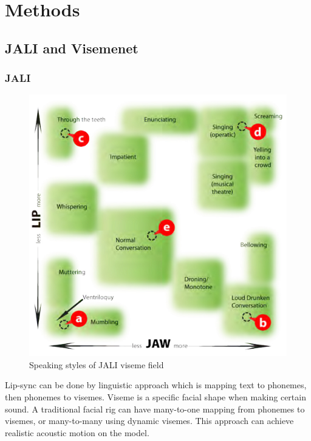 \documentclass[10pt,twocolumn,letterpaper]{article}
\begin{document}



\section{Methods}

\subsection{JALI and Visemenet}

\subsubsection{JALI}

\begin{figure}
   \includegraphics[width=1.0\linewidth]{jaliStyles}
   
   \caption{Speaking styles of JALI viseme field}
   \label{fig:jaliStyles}
\end{figure}

Lip-sync can be done by linguistic approach which is mapping text to phonemes, then phonemes to visemes\cite{ezzatMikeTalkTalkingFacial1998}. Viseme is a specific facial shape when making certain sound. A traditional facial rig can have many-to-one mapping from phonemes to visemes, or many-to-many using dynamic visemes. This approach can achieve realistic acoustic motion on the model.
\end{document}

